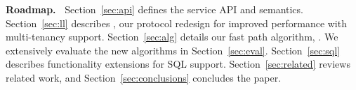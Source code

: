 {\bf Roadmap.\ }
 Section~\ref{sec:api} defines  the service API and semantics. Section~\ref{sec:ll} describes \sysll, 
 our protocol redesign for improved performance with multi-tenancy support.  
Section~\ref{sec:alg} details our fast path algorithm, \sys.
We extensively evaluate the new algorithms in Section~\ref{sec:eval}.  
Section~\ref{sec:sql} describes functionality extensions for SQL support.  
Section~\ref{sec:related} reviews related work, and  Section~\ref{sec:conclusions} concludes the paper.



